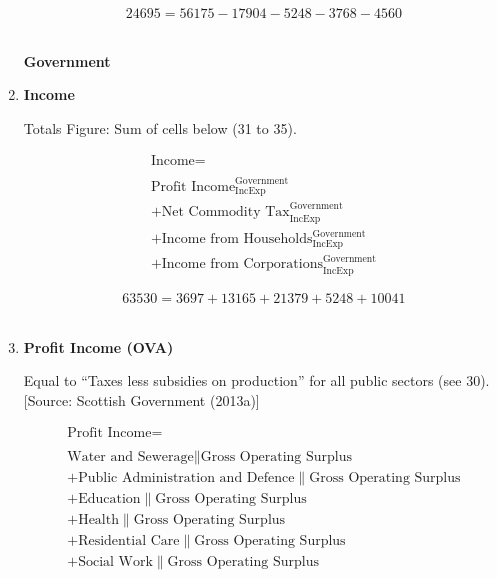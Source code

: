 \begin{enumerate}
\begin{equation} \nonumber
24695 = 56175-17904-5248-3768-4560
\end{equation}\\


\pagebreak

\begin{center}
\textbf{\LARGE Government}
\end{center}

\item \textbf {Income}

Totals Figure: Sum of cells below (31 to 35).

\begin{equation}
\begin{split}
\text{Income} =  \\ \\
\text{Profit Income}^\text{Government}_\text{IncExp}\\
+\text{Net Commodity Tax}^\text{Government}_\text{IncExp}\\
+\text{Income from Households}^\text{Government}_\text{IncExp}\\
+\text{Income from Corporations}^\text{Government}_\text{IncExp}
\end{split} \label{eq:2.5.34}
\end{equation}

\begin{equation} \nonumber
63530 = 3697+13165+21379+5248+10041
\end{equation}\\


\item \textbf {Profit Income (OVA)}

Equal to “Taxes less subsidies on production” for all public sectors (see 30). [Source: Scottish Government (2013a)]

\begin{equation}
\begin{split}
\text{Profit Income} =  \\ \\
\text{Water and Sewerage}\|\text{Gross Operating Surplus}\\
+\text{Public Administration and Defence}\|\text{Gross Operating Surplus}\\
+\text{Education}\|\text{Gross Operating Surplus}\\
+\text{Health}\|\text{Gross Operating Surplus}\\
+\text{Residential Care}\|\text{Gross Operating Surplus}\\
+\text{Social Work}\|\text{Gross Operating Surplus}
\end{split} \label{eq:2.5.35}
\end{equation}


\end{enumerate}
